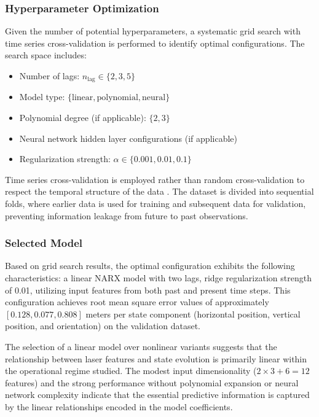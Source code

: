 \documentclass[conference]{IEEEtran}
\begin{document}
\subsubsection{Hyperparameter Optimization}

Given the number of potential hyperparameters, a systematic grid search with time series cross-validation is performed to identify optimal configurations. The search space includes:

\begin{itemize}
    \item Number of lags: $n_{\text{lag}} \in \{2, 3, 5\}$
    \item Model type: $\{\text{linear}, \text{polynomial}, \text{neural}\}$
    \item Polynomial degree (if applicable): $\{2, 3\}$
    \item Neural network hidden layer configurations (if applicable)
    \item Regularization strength: $\alpha \in \{0.001, 0.01, 0.1\}$
\end{itemize}

Time series cross-validation is employed rather than random cross-validation to respect the temporal structure of the data \cite{scikit-learn}. The dataset is divided into sequential folds, where earlier data is used for training and subsequent data for validation, preventing information leakage from future to past observations.

\subsubsection{Selected Model}

Based on grid search results, the optimal configuration exhibits the following characteristics: a linear NARX model with two lags, ridge regularization strength of 0.01, utilizing input features from both past and present time steps. This configuration achieves root mean square error values of approximately $[0.128, 0.077, 0.808]$ meters per state component (horizontal position, vertical position, and orientation) on the validation dataset.

The selection of a linear model over nonlinear variants suggests that the relationship between laser features and state evolution is primarily linear within the operational regime studied. The modest input dimensionality ($2 \times 3 + 6 = 12$ features) and the strong performance without polynomial expansion or neural network complexity indicate that the essential predictive information is captured by the linear relationships encoded in the model coefficients.
\end{document}
